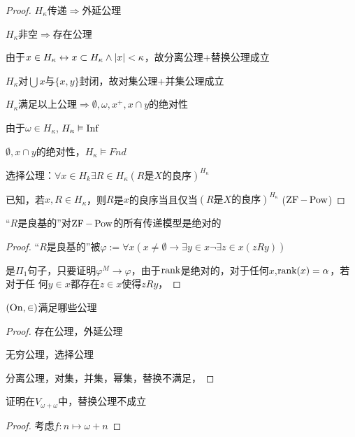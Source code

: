 \documentclass[11pt]{article}
\begin{document}
\begin{proof}
\(H_\kappa\)传递\(\Rightarrow\)外延公理

\(H_\kappa\)非空\(\Rightarrow\)存在公理

由于\(x\in H_\kappa\leftrightarrow x\subset H_\kappa\wedge\abs{x}<\kappa\)，故分离公理+替换公理成立

\(H_\kappa\)对\(\bigcup x\)与\(\{x,y\}\)封闭，故对集公理+并集公理成立

\(H_\kappa\)满足以上公理\(\Rightarrow \emptyset,\omega,x^+,x\cap y\)的绝对性

由于\(\omega\in H_\kappa\), \(H_\kappa\vDash\operatorname{Inf}\)

\(\emptyset,x\cap y\)的绝对性，\(H_\kappa\vDash Fnd\)

选择公理：\(\forall x\in H_k\exists R\in H_\kappa(R\text{是$X$的良序})^{H_\kappa}\)

已知，若\(x,R\in H_\kappa\)，则\(R\)是\(x\)的良序当且仅当\((R\text{是$X$的良序})^{H_\kappa}\) (\(\operatorname{ZF}-\operatorname{Pow}\))
\end{proof}

\begin{exercise}[7.10.12]
``\(R\)是良基的''对\(\operatorname{ZF}-\operatorname{Pow}\)的所有传递模型是绝对的
\end{exercise}

\begin{proof}
``\(R\)是良基的''被\(\varphi:=\forall x(x\neq\emptyset\to\exists y\in x\neg\exists z\in x(zRy))\)

是\(\Pi_1\)句子，只要证明\(\varphi^M\to\varphi\)，由于\(\text{rank}\)是绝对的，对于任何\(x\),\(\text{rank}(x)=\alpha\)，若对于任
何\(y\in x\)都存在\(z\in x\)使得\(zRy\)，
\end{proof}

\begin{exercise}[7.10.13]
\((\operatorname{On},\in)\)满足哪些公理
\end{exercise}

\begin{proof}
存在公理，外延公理

无穷公理，选择公理

分离公理，对集，并集，幂集，替换不满足，
\end{proof}

\begin{exercise}[7.10.14]
证明在\(V_{\omega+\omega}\)中，替换公理不成立
\end{exercise}

\begin{proof}
考虑\(f:n\mapsto \omega+n\)
\end{proof}
\end{document}
